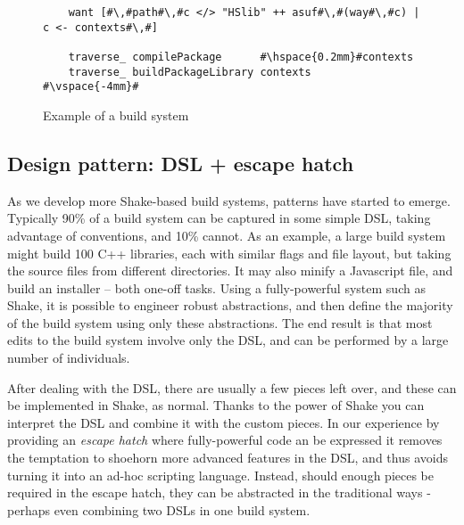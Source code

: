 \begin{figure}
\begin{lstlisting}
    want [#\,#path#\,#c </> "HSlib" ++ asuf#\,#(way#\,#c) | c <- contexts#\,#]

    traverse_ compilePackage      #\hspace{0.2mm}#contexts
    traverse_ buildPackageLibrary contexts
#\vspace{-4mm}#
\end{lstlisting}
\caption{Example of a build system\label{fig:example-abstractions}}
\end{figure}


\subsection{Design pattern: DSL + escape hatch}

As we develop more Shake-based build systems, patterns have started to emerge. Typically 90\% of a build system can be captured in some simple DSL, taking advantage of conventions, and 10\% cannot. As an example, a large build system might build 100 C++ libraries, each with similar flags and file layout, but taking the source files from different directories. It may also minify a Javascript file, and build an installer -- both one-off tasks. Using a fully-powerful system such as Shake, it is possible to engineer robust abstractions, and then define the majority of the build system using only these abstractions. The end result is that most edits to the build system involve only the DSL, and can be performed by a large number of individuals.

After dealing with the DSL, there are usually a few pieces left over, and these can be implemented in Shake, as normal. Thanks to the power of Shake you can interpret the DSL and combine it with the custom pieces. In our experience by providing an \textit{escape hatch} where fully-powerful code an be expressed it removes the temptation to shoehorn more advanced features in the DSL, and thus avoids turning it into an ad-hoc scripting language. Instead, should enough pieces be required in the escape hatch, they can be abstracted in the traditional ways - perhaps even combining two DSLs in one build system.

